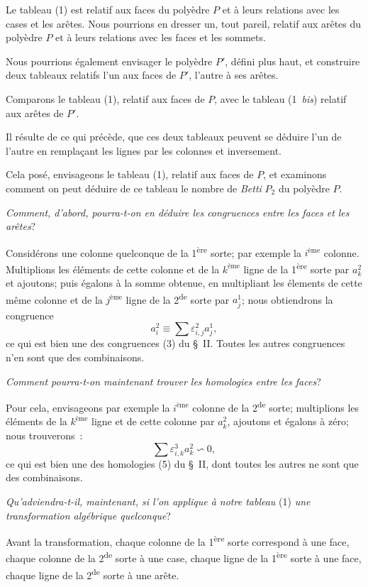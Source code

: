 \documentclass{article}
\begin{document}
Le tableau (1) est relatif aux faces du polyèdre $P$ et à leurs relations avec les cases et les arêtes. Nous pourrions en dresser un, tout pareil, relatif aux arêtes du polyèdre $P$ et à leurs relations avec les faces et les sommets.


Nous pourrions également envisager le polyèdre $P'$, défini plus haut, et construire deux tableaux relatifs l'un aux faces de $P'$, l'autre à ses arêtes.

Comparons le tableau (1), relatif aux faces de $P$, avec le tableau (1~\emph{bis}) relatif aux arêtes de $P'$.

Il résulte de ce qui précède, que ces deux tableaux peuvent se déduire l'un de l'autre en remplaçant les lignes par les colonnes et inversement.

Cela posé, envisageons le tableau (1), relatif aux faces de $P$, et examinons comment on peut déduire de ce tableau le nombre de \emph{Betti} $P_{2}$ du polyèdre $P$.

\emph{Comment, d'abord, pourra-t-on en déduire les congruences entre les faces et les arêtes}?

Considérons une colonne quelconque de la 1\textsuperscript{ère} sorte; par exemple la $i^{\text{ème}}$ colonne. Multiplions les éléments de cette colonne et de la $k^{\text{ème}}$ ligne de la 1\textsuperscript{ère} sorte par $a^{2}_{k}$ et ajoutons; puis égalons à la somme obtenue, en multipliant les élements de cette même colonne et de la $j^{\text{ème}}$ ligne de la 2\textsuperscript{de} sorte par $a^{1}_{j}$; nous obtiendrons la congruence
\[ a^{2}_{i} \equiv \sum \varepsilon^{2}_{i,j} a^{1}_{j}, \]
ce qui est bien une des congruences (3) du \S~II. Toutes les autres congruences n'en sont que des combinaisons.

\emph{Comment pourra-t-on maintenant trouver les homologies entre les faces}?

Pour cela, envisageons par exemple la $i^{\text{ème}}$ colonne de la 2\textsuperscript{de} sorte; multiplions les éléments de la $k^{\text{ème}}$ ligne et de cette colonne par $a^{2}_{k}$, ajoutons et égalons à zéro; nous trouverons~:
\[ \sum \varepsilon^{3}_{i,k} a^{2}_{k} \backsim 0, \]
ce qui est bien une des homologies (5) du \S~II, dont toutes les autres ne sont que des combinaisons.

\emph{Qu'adviendra-t-il, maintenant, si l'on applique à notre tableau} (1) \emph{une transformation algébrique quelconque}?

Avant la transformation, chaque colonne de la 1\textsuperscript{ère} sorte correspond
à une face, chaque colonne de la 2\textsuperscript{de} sorte à une case, chaque ligne de la 1\textsuperscript{ère} sorte à une face, chaque ligne de la 2\textsuperscript{de} sorte à une arête.
\end{document}
